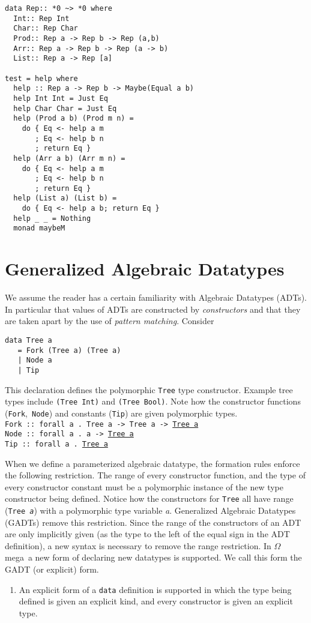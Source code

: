 \documentclass[11pt,twoside]{article}
\newcommand{\om}{$\Omega$mega}
\begin{document}
\begin{verbatim}
data Rep:: *0 ~> *0 where
  Int:: Rep Int
  Char:: Rep Char
  Prod:: Rep a -> Rep b -> Rep (a,b)
  Arr:: Rep a -> Rep b -> Rep (a -> b)
  List:: Rep a -> Rep [a]

test = help where
  help :: Rep a -> Rep b -> Maybe(Equal a b)
  help Int Int = Just Eq
  help Char Char = Just Eq
  help (Prod a b) (Prod m n) =
    do { Eq <- help a m
       ; Eq <- help b n
       ; return Eq }
  help (Arr a b) (Arr m n) =
    do { Eq <- help a m
       ; Eq <- help b n
       ; return Eq }
  help (List a) (List b) =
    do { Eq <- help a b; return Eq }
  help _ _ = Nothing
  monad maybeM
\end{verbatim}

\section{Generalized Algebraic Datatypes} \label{gadt}

We assume the reader has a certain familiarity with Algebraic Datatypes
(ADTs). In particular that values of ADTs are constructed by {\em constructors}
and that they are taken apart by the use of {\em pattern matching}. Consider

\begin{verbatim}
data Tree a
   = Fork (Tree a) (Tree a)
   | Node a
   | Tip
\end{verbatim}
This declaration defines the polymorphic {\tt Tree} type constructor. Example tree
types include {\tt (Tree Int)} and {\tt (Tree Bool)}.
Note how the constructor functions ({\tt Fork},\ {\tt Node}) and constants ({\tt Tip})
are given polymorphic types.\vspace*{0.1in} \\
\noindent
{\tt Fork :: forall a . Tree a -> Tree a -> \underline{Tree a}}\\
{\tt Node :: forall a . a -> \underline{Tree a}}\\
{\tt Tip :: forall a . \underline{Tree a}} \vspace*{0.1in}

When we define a parameterized algebraic
datatype, the formation rules enforce the following restriction. The
range of every constructor function, and the type of every constructor
constant must be a polymorphic instance of the new type constructor being
defined. Notice how the constructors for {\tt Tree} all have range
({\tt Tree {\it a}}) with a polymorphic type variable {\it a}.
Generalized Algebraic Datatypes (GADTs) remove this restriction.
Since the range of the constructors of an ADT are only implicitly
given (as the type to the left of the equal sign in the ADT definition),
a new syntax is necessary to remove the range restriction. In \om\
a new form of declaring new datatypes is supported. We call this form
the GADT (or explicit) form.
\begin{enumerate}

\item An explicit form of a {\tt data} definition is supported in which
the type being defined is given an explicit kind, and every constructor is
given an explicit type.

\end{enumerate}
\end{document}

